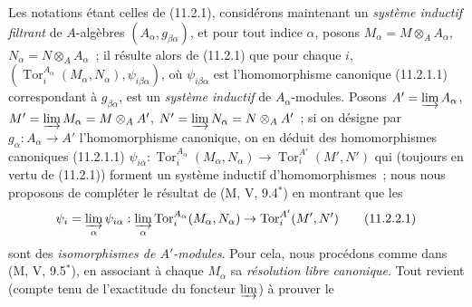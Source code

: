 \begin{env}[11.2.2]
\label{IV.11.2.2-fr}
Les notations étant celles de (11.2.1), considérons maintenant un
\emph{système inductif filtrant} de $A$-algèbres
$(A_\alpha,g_{\beta\alpha})$, et pour tout indice $\alpha$, posons
$M_\alpha=M\otimes_AA_\alpha$, $N_\alpha=N\otimes_AA_\alpha$~; il résulte
alors de (11.2.1) que pour chaque $i$,
$(\operatorname{Tor}_i^{A_\alpha}(M_\alpha,N_\alpha),
\psi_{i\beta\alpha})$, où $\psi_{i\beta\alpha}$ est l'homomorphisme
canonique (11.2.1.1) correspondant à $g_{\beta\alpha}$, est un \emph{système
inductif} de $A_\alpha$-modules. Posons
$A'=\varinjlim A_\alpha$, $M'=\varinjlim M_\alpha=M\otimes_AA'$,
$N'=\varinjlim N_\alpha=N\otimes_AA'$~; si on désigne par
$g_\alpha:A_\alpha\to A'$ l'homomorphisme canonique, on en déduit des
homomorphismes canoniques (11.2.1.1)
$\psi_{i\alpha}:\operatorname{Tor}_i^{A_\alpha}(M_\alpha,N_\alpha)
\to\operatorname{Tor}_i^{A'}(M',N')$ qui (toujours en vertu de (11.2.1))
forment un système inductif d'homomorphismes~; nous nous proposons de
compléter le résultat de (M, V, 9.4$^*$) en montrant que les
\begin{equation}
\psi_i=\varinjlim_\alpha\psi_{i\alpha}:
\varinjlim_\alpha\operatorname{Tor}_i^{A_\alpha}(M_\alpha,N_\alpha)
\to\operatorname{Tor}_i^{A'}(M',N')
\label{IV.11.2.2.1-fr}
\tag{11.2.2.1}
\end{equation}
sont des \emph{isomorphismes de $A'$-modules}. Pour cela, nous procédons
comme dans (M, V, 9.5$^*$), en associant à chaque $M_\alpha$ sa
\emph{résolution libre canonique}. Tout revient (compte tenu de l'exactitude
du foncteur $\varinjlim$) à prouver le
\end{env}

